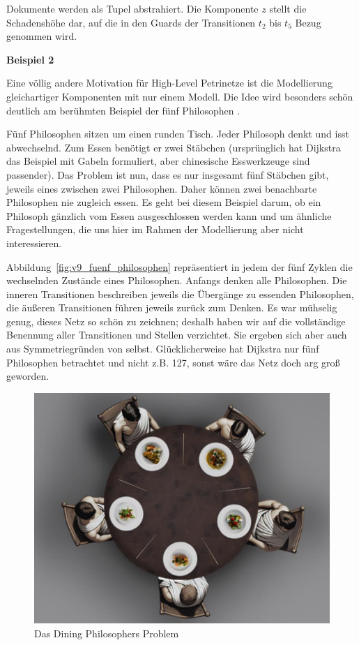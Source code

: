 \vspace{\baselineskip} %

Dokumente werden als Tupel abstrahiert. Die Komponente $z$ stellt die Schadenshöhe dar, auf die in den Guards der Transitionen $t_2$ bis $t_5$ Bezug genommen wird. 

\textbf{Beispiel 2}

Eine völlig andere Motivation für High-Level Petrinetze ist die Modellierung gleichartiger Komponenten mit nur einem Modell. Die Idee wird besonders schön deutlich am berühmten Beispiel der fünf Philosophen \cite{dij71}.

Fünf Philosophen sitzen um einen runden Tisch. 
Jeder Philosoph denkt und isst abwechselnd. Zum Essen benötigt er zwei Stäbchen (ursprünglich hat Dijkstra das Beispiel mit Gabeln formuliert, aber chinesische Esswerkzeuge sind passender). Das Problem ist nun, dass es nur insgesamt fünf Stäbchen gibt, jeweils eines zwischen zwei Philosophen. Daher können zwei benachbarte Philosophen nie zugleich essen. Es geht bei diesem Beispiel da\-rum, ob ein Philosoph gänzlich vom Essen ausgeschlossen werden kann und um ähnliche Fragestellungen, die uns hier im Rahmen der Modellierung aber nicht interessieren.

Abbildung~\ref{fig:v9_fuenf_philosophen} repräsentiert in jedem der fünf Zyklen die wechselnden Zustände eines Philosophen. Anfangs denken alle Philosophen. Die inneren Transitionen beschreiben jeweils die Übergänge zu essenden Philosophen, die äußeren Transitionen führen jeweils zurück zum Denken. Es war mühselig genug, dieses Netz so schön zu zeichnen; deshalb haben wir auf die vollständige Benennung aller Transitionen und Stellen verzichtet. Sie ergeben sich aber auch aus Symmetriegründen von selbst. Glücklicherweise hat Dijkstra nur fünf Philosophen betrachtet und nicht z.B. 127, sonst wäre das Netz doch arg groß geworden.

\clearpage %

\begin{figure}[!htbp]
	\centering
	\includegraphics[width=0.7\linewidth]{Bilder/Kapitel-5/philosophen1.png}
	\caption{Das Dining Philosophers Problem}
	\label{fig:enter-label}
\end{figure}

